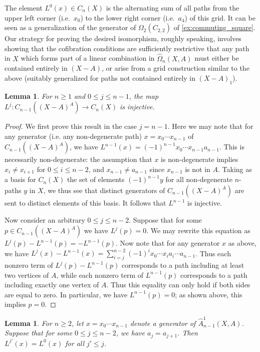\documentclass[11pt]{article}
\newtheorem{lemma}[theo]{Lemma}
\theoremstyle{definition}
\numberwithin{equation}{section}
\newcommand{\W}{(X - A)_1}
\newcommand{\tOmega}{\widehat{\Omega}}
\newcommand{\tAOne}{\widehat{A}^1}
\begin{document}
The element $L^0(x) \in C_n(X)$ is the alternating sum of all paths from the upper left corner (i.e.~$x_0$) to the lower right corner (i.e.~$a_4$) of this grid. 
It can be seen as a generalization of the generator of $\Omega_2(C_{2,2})$ of \cref{ex:commuting_square}.
Our strategy for proving the desired isomorphism, roughly speaking, involves showing that the cofibration conditions are sufficiently restrictive that any path in $X$ which forms part of a linear combination in $\tOmega_n(X,A)$ must either be contained entirely in $(X - A)$, or arise from a grid construction similar to the above (suitably generalized for paths not contained entirely in $\W$).

\begin{lemma}\label{L-injective}
For $n \geq 1$ and $0 \leq j \leq n-1$, the map $L^j \colon C_{n-1}((X - A)^A) \to C_{n}(X)$ is injective.
\end{lemma}

\begin{proof}
We first prove this result in the case $j = n-1$. Here we may note that for any generator (i.e.  any non-degenerate path) $x = x_0 \cdots x_{n-1}$ of $C_{n-1}((X - A)^A)$, we have $L^{n-1}(x) = (-1)^{n-1} x_0 \cdots x_{n-1} a_{n-1}$. This is necessarily non-degenerate: the assumption that $x$ is non-degenerate implies $x_i \neq x_{i+1}$ for $0 \leq i \leq n-2$, and $x_{n-1} \neq a_{n-1}$ since $x_{n-1}$ is not in $A$. Taking as a basis for $C_n(X)$ the set of elements $(-1)^{n-1} y$ for all non-degenerate $n$-paths $y$ in $X$, we thus see that distinct generators of $C_{n-1}((X-A)^A)$ are sent to distinct elements of this basis. It follows that $L^{n-1}$ is injective.

Now consider an arbitrary $0 \leq j \leq n-2$. Suppose that for some $p \in C_{n-1}((X - A)^A)$ we have $L^j(p) = 0$. We may rewrite this equation as $L^j(p) - L^{n-1}(p) = -L^{n-1}(p)$. Now note that for any generator $x$ as above, we have $L^j(x) - L^{n-1}(x) = \sum_{i = j}^{n-2} (-1)^ix_0 \cdots x_i a_i \cdots a_{n-1}$.  Thus each nonzero term of $L^j(p) - L^{n-1}(p)$ corresponds to a path including at least two vertices of $A$, while each nonzero term of $L^{n-1}(p)$ corresponds to a path including exactly one vertex of $A$. Thus this equality can only hold if both sides are equal to zero. In particular, we have $L^{n-1}(p) = 0$; as shown above, this implies $p = 0$.
\end{proof}

\begin{lemma}\label{L-truncate-pi}
For $n \geq 2$, let $x = x_0 \cdots x_{n-1}$ denote a generator of $\tAOne_{n-1}(X,A)$. Suppose that for some $0 \leq j \leq n-2$, we have $a_j = a_{j+1}$. Then $L^{j'}(x) = L^0(x)$ for all $j' \leq j$.
\end{lemma}
\end{document}

